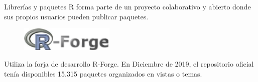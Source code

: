 \documentclass[xcolor=table]{beamer}
\begin{document}
\begin{frame}{Librerías y paquetes}
R forma parte de un proyecto colaborativo y abierto donde sus propios usuarios pueden publicar paquetes.
\newline
\newline
\begin{figure}
\centering
\includegraphics[width=0.4\textwidth]{r-forge.png}
\end{figure}
{Utiliza la forja de desarrollo R-Forge.}
\newline
\newline
{En Diciembre de 2019, el repositorio oficial tenía disponibles 15.315 paquetes organizados en vistas o temas. }
\end{frame}
\end{document}
